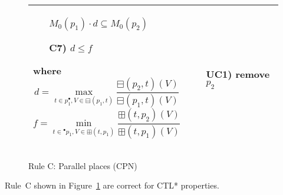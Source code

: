 \begin{figure}[h!]
\begin{adjustbox}{center}
\begin{tabular}{|p{75mm}|p{45mm}|}
\begin{itemize}[leftmargin=10mm]
            $M_0(p_1)\cdot d \subseteq M_0(p_2)$
            \item[C7)] $d\leq f$
        \end{itemize}
        where
        \[
            d = \max_{t\in p_1^\bullet,V\in \boxminus(p_1, t)}\frac{\boxminus(p_2, t)(V)}{\boxminus(p_1, t)(V)}
        \]
        \[
            f = \min_{t\in{}^\bullet p_1,V\in \boxplus(t, p_1)}\frac{\boxplus(t, p_2)(V)}{\boxplus(t, p_1)(V)}
        \]
        &
        \begin{itemize}[leftmargin=10mm]
            \item[UC1)] remove $p_2$
        \end{itemize} \\ \hline
        \end{tabular}
    \end{adjustbox}
    \caption{Rule C: Parallel places (CPN)}
    \label{fig:rule_c_cpn}
\end{figure}

\begin{theorem}
    Rule~C shown in Figure~\ref{fig:rule_c_cpn} are correct for CTL* properties.
\end{theorem}
